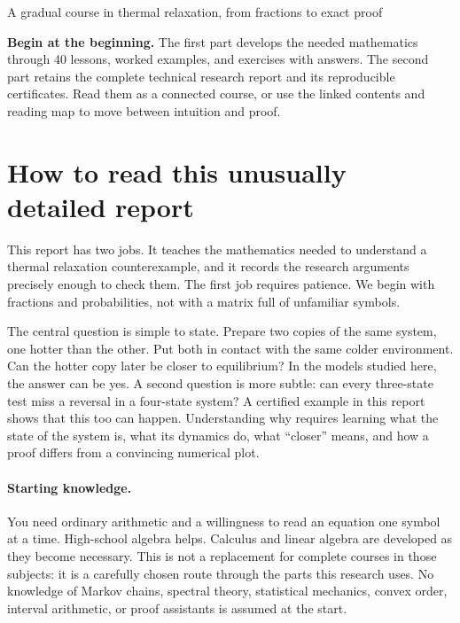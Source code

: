 \begin{center}
\large A gradual course in thermal relaxation, from fractions to exact proof
\end{center}
\vspace{1em}
\noindent\textbf{Begin at the beginning.} The first part develops the needed
mathematics through 40 lessons, worked examples, and exercises with answers.
The second part retains the complete technical research report and its
reproducible certificates. Read them as a connected course, or use the
linked contents and reading map to move between intuition and proof.
\clearpage
\section*{How to read this unusually detailed report}
This report has two jobs. It teaches the mathematics needed to understand a
thermal relaxation counterexample, and it records the research arguments
precisely enough to check them. The first job requires patience. We begin with
fractions and probabilities, not with a matrix full of unfamiliar symbols.

The central question is simple to state. Prepare two copies of the same system,
one hotter than the other. Put both in contact with the same colder environment.
Can the hotter copy later be closer to equilibrium? In the models studied here,
the answer can be yes. A second question is more subtle: can every three-state
test miss a reversal in a four-state system? A certified example in this report
shows that this too can happen. Understanding why requires learning what the
state of the system is, what its dynamics do, what ``closer'' means, and how a
proof differs from a convincing numerical plot.

\paragraph{Starting knowledge.}
You need ordinary arithmetic and a willingness to read an equation one symbol
at a time. High-school algebra helps. Calculus and linear algebra are developed
as they become necessary. This is not a replacement for complete courses in
those subjects: it is a carefully chosen route through the parts this research
uses. No knowledge of Markov chains, spectral theory, statistical mechanics,
convex order, interval arithmetic, or proof assistants is assumed at the start.

